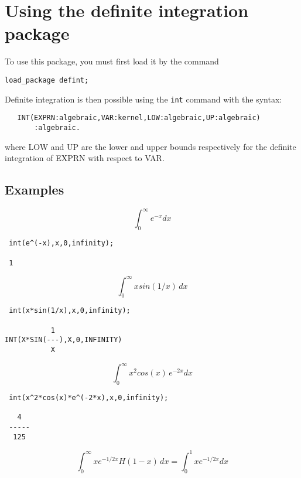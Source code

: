 \section{Using the definite integration package}
To use this package, you must first load it by the command
\begin{verbatim}
load_package defint;
\end{verbatim}
Definite integration is then possible using the \verb+int+
command with the syntax:
\begin{verbatim}
   INT(EXPRN:algebraic,VAR:kernel,LOW:algebraic,UP:algebraic)
       :algebraic.
\end{verbatim}
where LOW and UP are the lower and upper bounds respectively for
the definite integration of EXPRN with respect to VAR.

\subsection{Examples}

\begin{displaymath}
\int_{0}^{\infty} e^{-x} dx
\end{displaymath}


\begin{verbatim}
 int(e^(-x),x,0,infinity);

 1
\end{verbatim}

\begin{displaymath}
\int_{0}^{\infty} x sin(1/x) \, dx
\end{displaymath}

\begin{verbatim}
 int(x*sin(1/x),x,0,infinity);

           1
INT(X*SIN(---),X,0,INFINITY)
           X
\end{verbatim}

\begin{displaymath}
\int_{0}^{\infty} x^2 cos(x) \, e^{-2x} dx
\end{displaymath}

\begin{verbatim}
 int(x^2*cos(x)*e^(-2*x),x,0,infinity);

   4
 -----
  125
\end{verbatim}

\begin{displaymath}
\int_{0}^{\infty} x e^{-1/2x} H(1-x) \,dx = \int_{0}^{1} x e^{-1/2x} dx
\end{displaymath}

